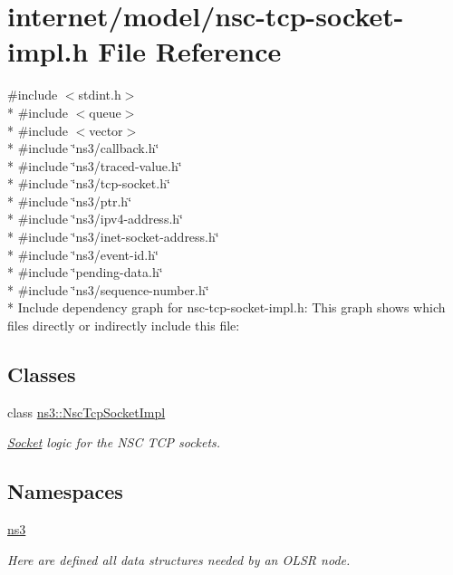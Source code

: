 \hypertarget{nsc-tcp-socket-impl_8h}{}\section{internet/model/nsc-\/tcp-\/socket-\/impl.h File Reference}
\label{nsc-tcp-socket-impl_8h}
{\ttfamily \#include $<$stdint.\+h$>$}\\*
{\ttfamily \#include $<$queue$>$}\\*
{\ttfamily \#include $<$vector$>$}\\*
{\ttfamily \#include \char`\"{}ns3/callback.\+h\char`\"{}}\\*
{\ttfamily \#include \char`\"{}ns3/traced-\/value.\+h\char`\"{}}\\*
{\ttfamily \#include \char`\"{}ns3/tcp-\/socket.\+h\char`\"{}}\\*
{\ttfamily \#include \char`\"{}ns3/ptr.\+h\char`\"{}}\\*
{\ttfamily \#include \char`\"{}ns3/ipv4-\/address.\+h\char`\"{}}\\*
{\ttfamily \#include \char`\"{}ns3/inet-\/socket-\/address.\+h\char`\"{}}\\*
{\ttfamily \#include \char`\"{}ns3/event-\/id.\+h\char`\"{}}\\*
{\ttfamily \#include \char`\"{}pending-\/data.\+h\char`\"{}}\\*
{\ttfamily \#include \char`\"{}ns3/sequence-\/number.\+h\char`\"{}}\\*
Include dependency graph for nsc-\/tcp-\/socket-\/impl.h\+:
This graph shows which files directly or indirectly include this file\+:
\subsection*{Classes}
\begin{DoxyCompactItemize}
\item 
class \hyperlink{classns3_1_1NscTcpSocketImpl}{ns3\+::\+Nsc\+Tcp\+Socket\+Impl}
\begin{DoxyCompactList}\small\item\em \hyperlink{classns3_1_1Socket}{Socket} logic for the N\+SC T\+CP sockets. \end{DoxyCompactList}\end{DoxyCompactItemize}
\subsection*{Namespaces}
\begin{DoxyCompactItemize}
\item 
 \hyperlink{namespacens3}{ns3}
\begin{DoxyCompactList}\small\item\em Here are defined all data structures needed by an O\+L\+SR node. \end{DoxyCompactList}\end{DoxyCompactItemize}
